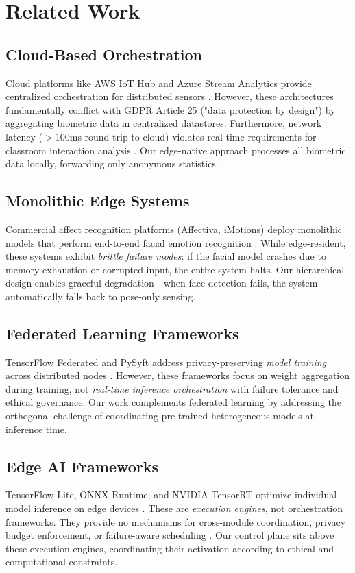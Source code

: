 \documentclass[conference]{IEEEtran}
\begin{document}
\section{Related Work}

\subsection{Cloud-Based Orchestration}
Cloud platforms like AWS IoT Hub and Azure Stream Analytics provide centralized orchestration for distributed sensors \cite{b6}. However, these architectures fundamentally conflict with GDPR Article 25 ("data protection by design") by aggregating biometric data in centralized datastores. Furthermore, network latency ($>$100ms round-trip to cloud) violates real-time requirements for classroom interaction analysis \cite{b15}. Our edge-native approach processes all biometric data locally, forwarding only anonymous statistics.

\subsection{Monolithic Edge Systems}
Commercial affect recognition platforms (Affectiva, iMotions) deploy monolithic models that perform end-to-end facial emotion recognition \cite{b7}. While edge-resident, these systems exhibit \textit{brittle failure modes}: if the facial model crashes due to memory exhaustion or corrupted input, the entire system halts. Our hierarchical design enables graceful degradation—when face detection fails, the system automatically falls back to pose-only sensing.

\subsection{Federated Learning Frameworks}
TensorFlow Federated and PySyft address privacy-preserving \textit{model training} across distributed nodes \cite{b8}. However, these frameworks focus on weight aggregation during training, not \textit{real-time inference orchestration} with failure tolerance and ethical governance.  Our work complements federated learning by addressing the orthogonal challenge of coordinating pre-trained heterogeneous models at inference time.

\subsection{Edge AI Frameworks}
TensorFlow Lite, ONNX Runtime, and NVIDIA TensorRT optimize individual model inference on edge devices \cite{b9, b10}. These are \textit{execution engines}, not orchestration frameworks. They provide no mechanisms for cross-module coordination, privacy budget enforcement, or failure-aware scheduling \cite{b16}. Our control plane sits above these execution engines, coordinating their activation according to ethical and computational constraints.
\end{document}
